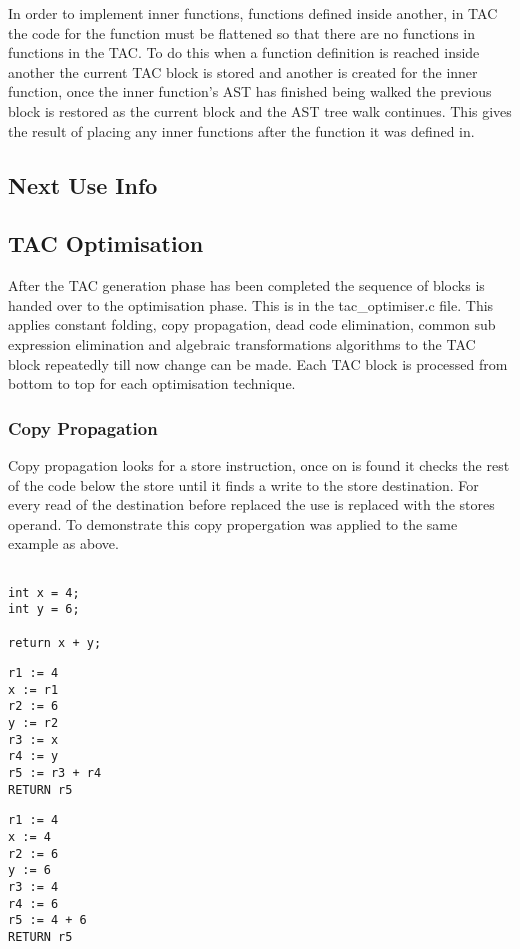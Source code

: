 \documentclass{article}
\begin{document}
In order to implement inner functions, functions defined inside another, in TAC
the code for the function must be flattened so that there are no functions in functions
in the TAC. To do this when a function definition is reached inside another the current
TAC block is stored and another is created for the inner function, once the inner function's
AST has finished being walked the previous block is restored as the current block and
the AST tree walk continues. This gives the result of placing any inner functions after
the function it was defined in.

\subsection{Next Use Info}

\subsection{TAC Optimisation}

After the TAC generation phase has been completed the sequence of blocks is handed
over to the optimisation phase. This is in the tac\_optimiser.c file. This applies
constant folding, copy propagation, dead code elimination, common sub expression
elimination and algebraic transformations algorithms to the TAC block repeatedly till
now change can be made. Each TAC block is processed from bottom to top for each
optimisation technique.

\subsubsection{Copy Propagation}

Copy propagation looks for a store instruction, once on is found it checks the
rest of the code below the store until it finds a write to the store destination.
For every read of the destination before replaced the use is replaced with the
stores operand. To demonstrate this copy propergation was applied to the same example
as above.

\begin{minipage}{0.3\textwidth}
\begin{lstlisting}

int x = 4;
int y = 6;

return x + y;

\end{lstlisting}
\end{minipage}%
\begin{minipage}{0.3\textwidth}
\begin{lstlisting}
r1 := 4
x := r1
r2 := 6
y := r2
r3 := x
r4 := y
r5 := r3 + r4
RETURN r5

\end{lstlisting}
\end{minipage}%
\begin{minipage}{0.3\textwidth}
\begin{lstlisting}
r1 := 4
x := 4
r2 := 6
y := 6
r3 := 4
r4 := 6
r5 := 4 + 6
RETURN r5
\end{lstlisting}
\end{minipage}%
\end{document}
